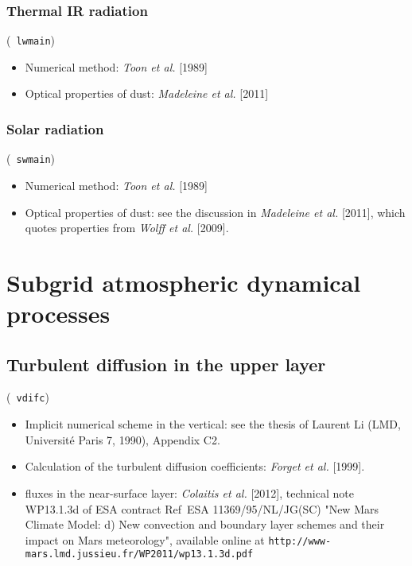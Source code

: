 \subsubsection*{Thermal IR radiation}
 (\verb+ lwmain+)
\begin{itemize}
\item Numerical method:  {\it Toon et al.} [1989] 
\item Optical properties of dust:  {\it Madeleine et al.} [2011] 
\nocite{Toon:89,Made:11}
\end{itemize}

\subsubsection*{Solar radiation}
 (\verb+ swmain+)
\begin{itemize}
\item Numerical method: {\it Toon et al.} [1989]
\nocite{Toon:89}

\item Optical properties of dust: 
see the discussion in {\it Madeleine et al.} [2011], which quotes
properties from {\it Wolff et al.} [2009].
\nocite{Made:11,Wolf:09}
\end{itemize}

\section{Subgrid atmospheric dynamical processes}

\subsection{Turbulent diffusion in the upper layer}
 (\verb+ vdifc+)

\begin{itemize}
\item Implicit numerical scheme in the vertical:
see the thesis of Laurent Li (LMD, Universit\'e Paris 7, 1990), Appendix C2.

\item Calculation of the turbulent diffusion coefficients:
{\it Forget et al. } [1999].

\item fluxes in the near-surface layer: {\it Colaitis et al.} [2012],
technical note WP13.1.3d of ESA contract
Ref~ESA 11369/95/NL/JG(SC) "New Mars Climate Model:
d) New convection and boundary layer schemes and their impact on
Mars meteorology", available online at 
\verb+http://www-mars.lmd.jussieu.fr/WP2011/wp13.1.3d.pdf+

\end{itemize}

